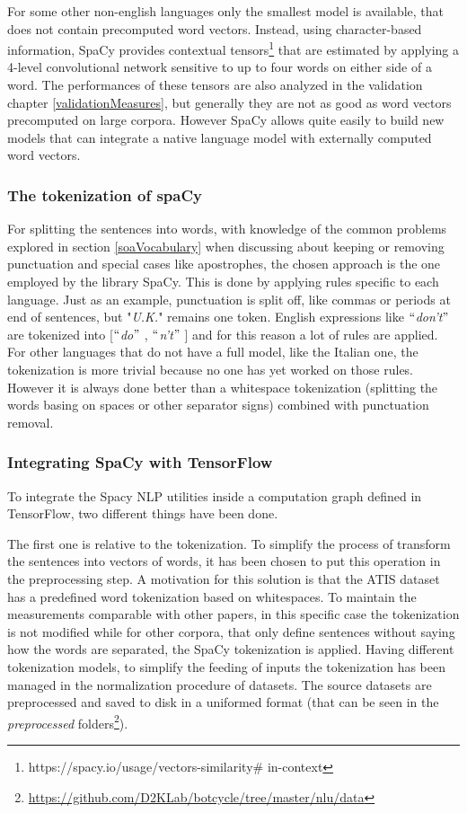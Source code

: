 For some other non-english languages only the smallest model is available, that does not contain precomputed word vectors. Instead, using character-based information, SpaCy provides contextual tensors\footnote{ https://spacy.io/usage/vectors-similarity$\#$ in-context  } that are estimated by applying a 4-level convolutional network sensitive to up to four words on either side of a word. The performances of these tensors are also analyzed in the validation chapter \ref{validationMeasures}, but generally they are not as good as word vectors precomputed on large corpora. However SpaCy allows quite easily to build new models that can integrate a native language model with externally computed word vectors.

\subsubsection{The tokenization of spaCy}
For splitting the sentences into words, with knowledge of the common problems explored in section \ref{soaVocabulary} when discussing about keeping or removing punctuation and special cases like apostrophes, the chosen approach is the one employed by the library SpaCy. This is done by applying rules specific to each language. Just as an example, punctuation is split off, like commas or periods at end of sentences, but "\textit{U.K.}" remains one token. English expressions like $``$\textit{don't}$"$  are tokenized into [$``$\textit{do}$"$ , $``$\textit{n't}$"$ ] and for this reason a lot of rules are applied. For other languages that do not have a full model, like the Italian one, the tokenization is more trivial because no one has yet worked on those rules. However it is always done better than a whitespace tokenization (splitting the words basing on spaces or other separator signs) combined with punctuation removal.

\subsubsection{Integrating SpaCy with TensorFlow}
\label{implementationSpacyPyFunc}

To integrate the Spacy NLP utilities inside a computation graph defined in TensorFlow, two different things have been done.

The first one is relative to the tokenization. To simplify the process of transform the sentences into vectors of words, it has been chosen to put this operation in the preprocessing step. A motivation for this solution is that the ATIS dataset~\cite{hemphill1990atis} has a predefined word tokenization based on whitespaces. To maintain the measurements comparable with other papers, in this specific case the tokenization is not modified while for other corpora, that only define sentences without saying how the words are separated, the SpaCy tokenization is applied. Having different tokenization models, to simplify the feeding of inputs the tokenization has been managed in the normalization procedure of datasets. The source datasets are preprocessed and saved to disk in a uniformed format (that can be seen in the \textit{preprocessed} folders\footnote{\url{https://github.com/D2KLab/botcycle/tree/master/nlu/data}}).

